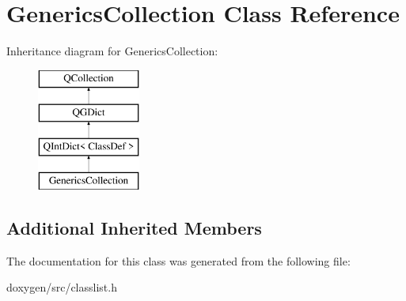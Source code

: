 \hypertarget{class_generics_collection}{}\section{Generics\+Collection Class Reference}
\label{class_generics_collection}
Inheritance diagram for Generics\+Collection\+:\begin{figure}[H]
\begin{center}
\leavevmode
\includegraphics[height=4.000000cm]{class_generics_collection}
\end{center}
\end{figure}
\subsection*{Additional Inherited Members}


The documentation for this class was generated from the following file\+:\begin{DoxyCompactItemize}
\item 
doxygen/src/classlist.\+h\end{DoxyCompactItemize}
